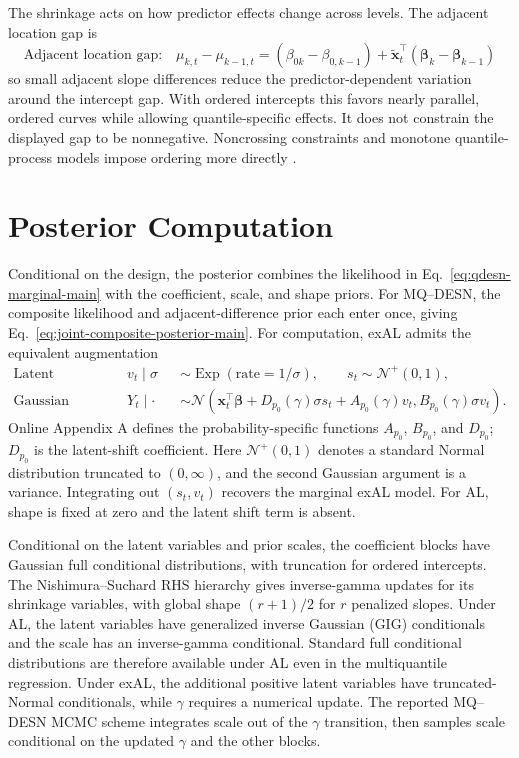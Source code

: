 \documentclass[12pt,letterpaper]{article}
\numberwithin{equation}{section}
\newcommand{\Normal}{\mathcal{N}}
\newcommand{\TN}{\mathcal{N}^{+}}
\newcommand{\vect}[1]{\bm{#1}}
\newcommand{\Exp}{\operatorname{Exp}}
\begin{document}
The shrinkage acts on how predictor effects change across levels. The adjacent
location gap is
\[
\text{Adjacent location gap:}\quad
\mu_{k,t}-\mu_{k-1,t}
=(\beta_{0k}-\beta_{0,k-1})
+\tilde{\vect x}_t^\top(\vect\beta_k-\vect\beta_{k-1})
\]
so small adjacent slope differences reduce the predictor-dependent variation
around the intercept gap. With ordered intercepts this favors nearly parallel,
ordered curves while allowing quantile-specific effects. It does not constrain
the displayed gap to be nonnegative. Noncrossing constraints and monotone
quantile-process models impose ordering more directly
\citep{WuLiu2009StepwiseNCQR,BondellReichWang2010NoncrossingQR,
YangTokdar2017JointQuantilePlanes}.

\section{Posterior Computation}
\label{sec:inference}

Conditional on the design, the posterior combines the likelihood in
Eq.~\eqref{eq:qdesn-marginal-main} with the coefficient, scale, and shape
priors. For MQ--DESN, the composite likelihood and adjacent-difference prior
each enter once, giving Eq.~\eqref{eq:joint-composite-posterior-main}.
For computation, exAL admits the equivalent
augmentation
\begin{equation}
\begin{alignedat}{2}
\text{Latent variables:}\quad
&v_t\mid\sigma&&\sim\Exp(\mathrm{rate}=1/\sigma),
\qquad s_t\sim\TN(0,1),\\
\text{Gaussian conditional:}\quad
&Y_t\mid\cdot&&\sim\Normal\!\left(
\vect x_t^\top\vect\beta+D_{p_0}(\gamma)\sigma s_t
+A_{p_0}(\gamma)v_t,
B_{p_0}(\gamma)\sigma v_t\right).
\end{alignedat}
\label{eq:qdesn-aug}
\end{equation}
Online Appendix A defines the
probability-specific functions \(A_{p_0}\), \(B_{p_0}\), and \(D_{p_0}\);
\(D_{p_0}\) is the latent-shift coefficient. Here \(\TN(0,1)\) denotes a
standard Normal distribution truncated to \((0,\infty)\), and the second
Gaussian argument is a variance.
Integrating out \((s_t,v_t)\) recovers the marginal exAL model. For AL,
shape is fixed at zero and the latent shift term is absent.

Conditional on the latent variables and prior scales, the coefficient blocks
have Gaussian full conditional distributions, with truncation for ordered
intercepts. The Nishimura--Suchard RHS hierarchy gives inverse-gamma updates for its
shrinkage variables, with global shape \((r+1)/2\) for \(r\) penalized slopes.
Under AL, the latent variables have generalized inverse Gaussian (GIG)
conditionals and the scale has an inverse-gamma conditional. Standard full
conditional distributions are therefore available under AL even in the multiquantile
regression. Under exAL, the additional positive latent variables have
truncated-Normal conditionals, while \(\gamma\) requires a numerical update.
The reported MQ--DESN MCMC scheme integrates scale out of the \(\gamma\)
transition, then samples scale conditional on the updated \(\gamma\) and the
other blocks.
\end{document}
